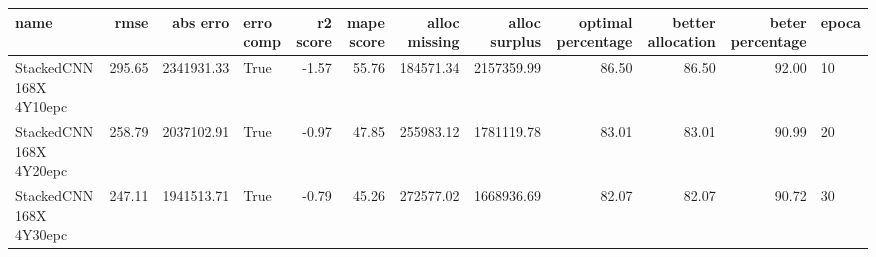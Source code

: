 \begin{tabular}{lrrlrrrrrrrl}
\toprule
name & rmse & abs erro & erro comp & r2 score & mape score & alloc missing & alloc surplus & optimal percentage & better allocation & beter percentage & epoca \\
\midrule
StackedCNN 168X 4Y10epc & 295.65 & 2341931.33 & True & -1.57 & 55.76 & 184571.34 & 2157359.99 & 86.50 & 86.50 & 92.00 & 10 \\
StackedCNN 168X 4Y20epc & 258.79 & 2037102.91 & True & -0.97 & 47.85 & 255983.12 & 1781119.78 & 83.01 & 83.01 & 90.99 & 20 \\
StackedCNN 168X 4Y30epc & 247.11 & 1941513.71 & True & -0.79 & 45.26 & 272577.02 & 1668936.69 & 82.07 & 82.07 & 90.72 & 30 \\
\bottomrule
\end{tabular}
